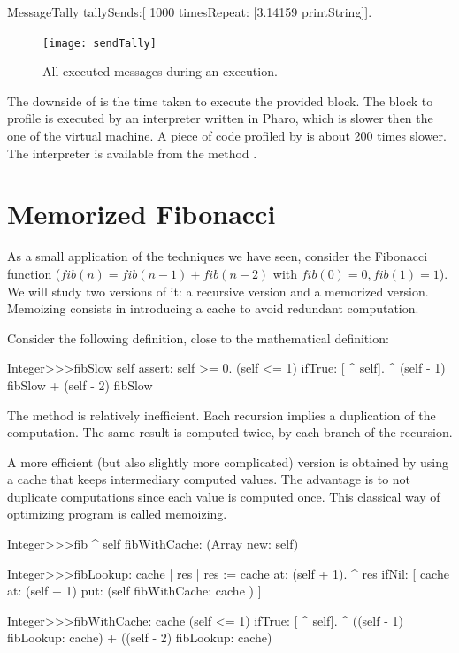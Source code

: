 \documentclass[a4paper,10pt,twoside]{book}
\begin{document}
\begin{code}{}
MessageTally tallySends:[ 1000 timesRepeat:  [3.14159 printString]].
\end{code}

\begin{figure}
	\begin{center}
	\texttt{[image: sendTally]}
	\caption{All executed messages during an execution.}
	\end{center}
\end{figure}

The downside of  is the time taken to execute the provided block. The block to profile is executed by an interpreter written in Pharo, which is slower then the one of the virtual machine. A piece of code profiled by  is about 200 times slower. The interpreter is available from the method .

\section{Memorized Fibonacci}

As a small application of the techniques we have seen, consider the Fibonacci function ($fib (n) = fib (n-1) + fib(n-2)$ with $fib(0)=0, fib(1)=1$). We will study two versions of it: a recursive version and a memorized version. Memoizing consists in introducing a cache to avoid redundant computation.

Consider the following definition, close to the mathematical definition:
\begin{code}{}
Integer>>>fibSlow
	self assert: self >= 0.
	(self <= 1) ifTrue: [ ^ self].
	^ (self - 1) fibSlow + (self - 2) fibSlow
\end{code}

The method  is relatively inefficient. Each recursion implies a duplication of the computation. The same result is computed twice, by each branch of the recursion.

A more efficient (but also slightly more complicated) version is obtained by using a cache that keeps intermediary computed values. The advantage is to not duplicate computations since each value is computed once. This classical way of optimizing program is called memoizing. 
      
\begin{code}{}
Integer>>>fib
	^ self fibWithCache: (Array new: self)

Integer>>>fibLookup: cache
	| res |
	res := cache at: (self + 1).
	^ res ifNil: [ cache at: (self + 1) put:  (self fibWithCache: cache  ) ]

Integer>>>fibWithCache:  cache
	(self <= 1) ifTrue: [ ^ self].
	^ ((self - 1) fibLookup: cache) + ((self - 2) fibLookup: cache)  
\end{code}
\end{document}
